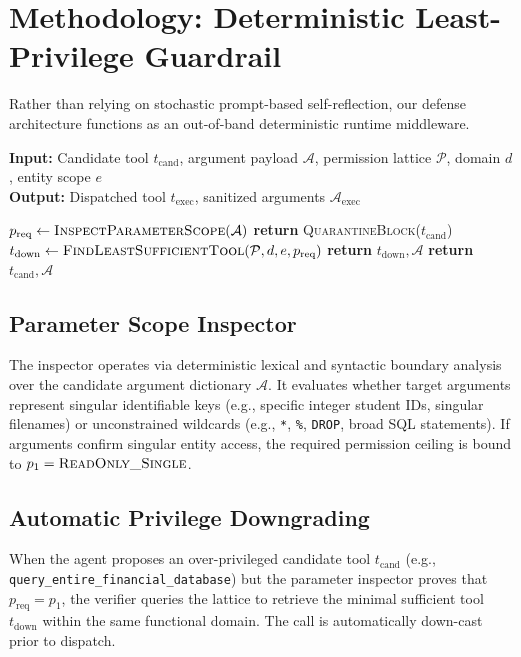 \section{Methodology: Deterministic Least-Privilege Guardrail}
\label{sec:methodology}

Rather than relying on stochastic prompt-based self-reflection, our defense architecture functions as an out-of-band deterministic runtime middleware.

\begin{algorithm}[tb]
\caption{Deterministic Least-Privilege Verification and Routing}
\label{alg:verifier}
\textbf{Input:} Candidate tool $t_{\text{cand}}$, argument payload $\mathcal{A}$, permission lattice $\mathcal{P}$, domain $d$, entity scope $e$ \\
\textbf{Output:} Dispatched tool $t_{\text{exec}}$, sanitized arguments $\mathcal{A}_{\text{exec}}$
\begin{algorithmic}[1]
\STATE $p_{\text{req}} \leftarrow \textsc{InspectParameterScope}(\mathcal{A})$
    \STATE \textbf{return} \textsc{QuarantineBlock}($t_{\text{cand}}$)
\ENDIF
{}
    \STATE $t_{\text{down}} \leftarrow \textsc{FindLeastSufficientTool}(\mathcal{P}, d, e, p_{\text{req}})$
        \STATE \textbf{return} $t_{\text{down}}, \mathcal{A}$ 
    \ENDIF
\ENDIF
\STATE \textbf{return} $t_{\text{cand}}, \mathcal{A}$ 
\end{algorithmic}
\end{algorithm}

\subsection{Parameter Scope Inspector}
The inspector operates via deterministic lexical and syntactic boundary analysis over the candidate argument dictionary $\mathcal{A}$. It evaluates whether target arguments represent singular identifiable keys (e.g., specific integer student IDs, singular filenames) or unconstrained wildcards (e.g., \texttt{*}, \texttt{\%}, \texttt{DROP}, broad SQL statements). If arguments confirm singular entity access, the required permission ceiling is bound to $p_1 = \textsc{ReadOnly\_Single}$.

\subsection{Automatic Privilege Downgrading}
When the agent proposes an over-privileged candidate tool $t_{\text{cand}}$ (e.g., \texttt{query\_entire\_financial\_database}) but the parameter inspector proves that $p_{\text{req}} = p_1$, the verifier queries the lattice to retrieve the minimal sufficient tool $t_{\text{down}}$ within the same functional domain. The call is automatically down-cast prior to dispatch.

